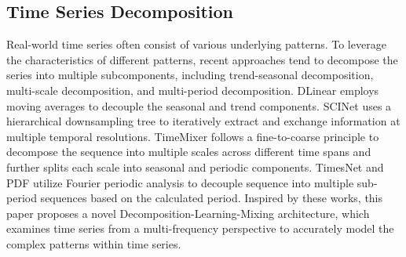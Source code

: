 \subsection{Time Series Decomposition}
Real-world time series often consist of various underlying patterns. To leverage the characteristics of different patterns, recent approaches tend to decompose the series into multiple subcomponents, including trend-seasonal decomposition, multi-scale decomposition, and multi-period decomposition. DLinear \citep{zeng2023transformers} employs moving averages to decouple the seasonal and trend components.  SCINet \citep{liu2022scinet} uses a hierarchical downsampling tree to iteratively extract and exchange information at multiple temporal resolutions. TimeMixer \citep{wang2024timemixer} follows a fine-to-coarse principle to decompose the sequence into multiple scales across different time spans and further splits each scale into seasonal and periodic components. TimesNet \citep{wu2023timesnet} and PDF \citep{dai2024pdf} utilize Fourier periodic analysis to decouple sequence into multiple sub-period sequences based on the calculated period.
Inspired by these works, this paper proposes a novel Decomposition-Learning-Mixing architecture, which examines time series from a multi-frequency perspective to accurately model the complex patterns within time series.